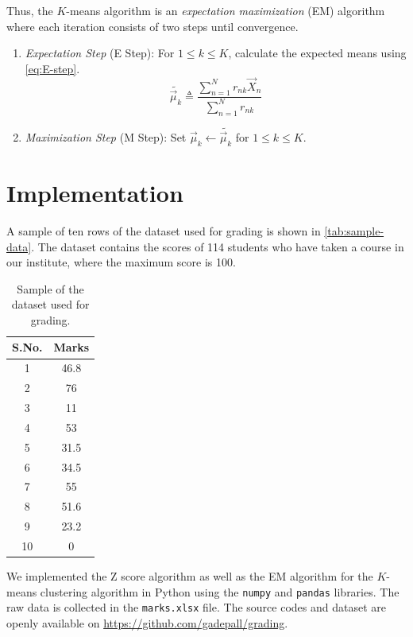 \documentclass[conference]{IEEEtran}
\begin{document}
Thus, the $K$-means algorithm is an \emph{expectation maximization} (EM)
algorithm where each iteration consists of two steps until convergence.
\begin{enumerate}
    \item \emph{Expectation Step} (E Step): For $1 \le k \le K$, calculate the
    expected means using \eqref{eq:E-step}.
    \begin{equation}
        \tilde{\vec{\mu}_k} \triangleq \frac{\sum_{n=1}^Nr_{nk}\vec{X}_n}{\sum_{n=1}^Nr_{nk}}
        \label{eq:E-step}
    \end{equation}
    \item \emph{Maximization Step} (M Step): Set $\vec{\mu}_k \leftarrow
    \tilde{\vec{\mu}_k}$ for $1 \le k \le K$.
\end{enumerate}

\section{Implementation}
\label{sec:implementation}

A sample of ten rows of the dataset used for grading is shown in
\autoref{tab:sample-data}. The dataset contains the scores of 114 students who
have taken a course in our institute, where the maximum score is 100.
\begin{table}[!ht]
    \centering
    \begin{tabular}{|c|c|}
        \hline
        \textbf{S.No.} & \textbf{Marks} \\
        \hline
        1 & 46.8 \\
        \hline
        2 & 76 \\
        \hline
        3 & 11 \\
        \hline
        4 & 53 \\
        \hline
        5 & 31.5 \\
        \hline
        6 & 34.5 \\
        \hline
        7 & 55 \\
        \hline
        8 & 51.6 \\
        \hline
        9 & 23.2 \\
        \hline
        10 & 0 \\
        \hline
    \end{tabular}
    \caption{Sample of the dataset used for grading.}
    \label{tab:sample-data}
\end{table}

We implemented the Z score algorithm as well as the EM algorithm for the
$K$-means clustering algorithm in Python using the \texttt{numpy} and
\texttt{pandas} libraries. The raw data is collected in the \texttt{marks.xlsx}
file. The source codes and dataset are openly available on
\href{https://github.com/gadepall/grading}{https://github.com/gadepall/grading}.
\end{document}
